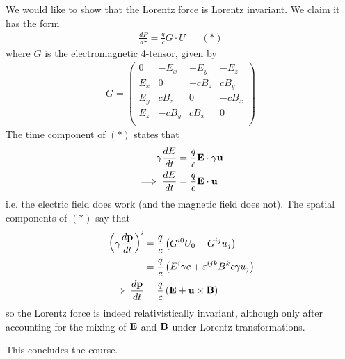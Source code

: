 \documentclass{../../template/note}
\begin{document}
    \begin{example*}
        We would like to show that the Lorentz force is Lorentz invariant. We claim it has the form
        \begin{align*}
            \frac{dP}{d\tau} = \frac{q}{c} G \cdot U && (*)
        \end{align*}
        where \(G\) is the electromagnetic 4-tensor, given by
        \begin{align*}
            G = \begin{pmatrix}
                0 & -E_x & -E_y & -E_z \\
                E_x & 0 & -cB_z & cB_y \\
                E_y & cB_z & 0 & -cB_x \\
                E_z & -cB_y & cB_x & 0 \\
            \end{pmatrix}
        \end{align*}
        The time component of \((*)\) states that
        \begin{align*}
            \gamma \frac{dE}{dt} &= \frac{q}{c} \V E \cdot \gamma \V u \\
            \implies \frac{dE}{dt} &= \frac{q}{c} \V E \cdot \V u
        \end{align*}
        i.e. the electric field does work (and the magnetic field does not). The spatial components of \((*)\) say that
        \begin{align*}
            \left(\gamma \frac{d\V p}{dt}\right)^i &= \frac{q}{c}\left(G^{i0}U_0-G^{ij}u_j\right) \\
            &= \frac q c \left(E^i \gamma c + \eps^{ijk}B^kc\gamma u_j\right) \\
            \implies \frac{d\V p}{dt} &= \frac q c \left(\V E + \V u \times \V B\right)
        \end{align*}
        so the Lorentz force is indeed relativistically invariant, although only after accounting for the mixing of \(\V E\) and \(\V B\) under Lorentz transformations.    
    \end{example*}
    
    This concludes the course.
    
    
    
    
    
    
    
    
    
    
    

    
    
\end{document}
